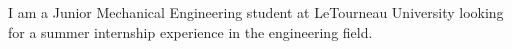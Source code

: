 I am a Junior Mechanical Engineering student at LeTourneau University looking for a summer internship experience in the engineering field.